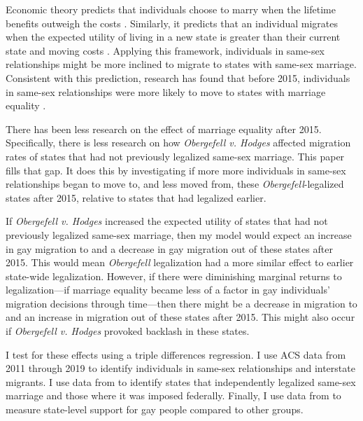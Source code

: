 \documentclass[12pt,letterpaper]{article}
\begin{document}
Economic theory predicts that individuals choose to marry when the lifetime benefits outweigh the costs \citep{9}. Similarly, it predicts that an individual migrates when the expected utility of living in a new state is greater than their current state and moving costs \citep{8, 12}. Applying this framework, individuals in same-sex relationships might be more inclined to migrate to states with same-sex marriage. Consistent with this prediction, research has found that before 2015, individuals in same-sex relationships were more likely to move to states with marriage equality \citep{1, 12}. 

There has been less research on the effect of marriage equality after 2015. Specifically, there is less research on how \textit{Obergefell v. Hodges} affected migration rates of states that had not previously legalized same-sex marriage. This paper fills that gap. It does this by investigating if more more individuals in same-sex relationships began to move to, and less moved from, these \textit{Obergefell}-legalized states after 2015, relative to states that had legalized earlier. 

If \textit{Obergefell v. Hodges} increased the expected utility of states that had not previously legalized same-sex marriage, then my model would expect an increase in gay migration to and a decrease in gay migration out of these states after 2015. This would mean \textit{Obergefell} legalization had a more similar effect to earlier state-wide legalization. However, if there were diminishing marginal returns to legalization—if marriage equality became less of a factor in gay individuals' migration decisions through time—then there might be a decrease in migration to and an increase in migration out of these states after 2015. This might also occur if \textit{Obergefell v. Hodges} provoked backlash in these states.

I test for these effects using a triple differences regression. I use ACS data from 2011 through 2019 to identify individuals in same-sex relationships and interstate migrants. I use data from \citet{27} to identify states that independently legalized same-sex marriage and those where it was imposed federally. Finally, I use data from \citet{29} to measure state-level support for gay people compared to other groups.
\end{document}
